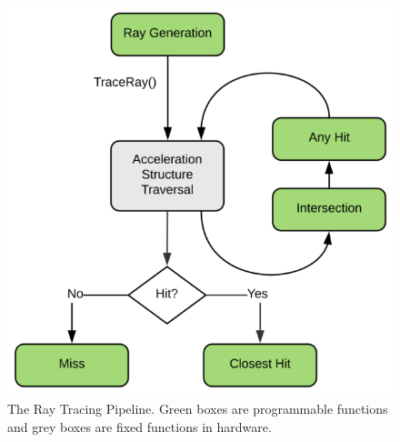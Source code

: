 \documentclass[12pt]{article}
\begin{document}
\begin{figure}[H]
    \begin{center}
        \includegraphics[scale=0.25]{RayTracing-Pipeline}
    \end{center}
    \caption{
        The Ray Tracing Pipeline.
        Green boxes are programmable functions and grey boxes are fixed functions in hardware.
        \parencite{NVIDIA:DXR-Intro}
        }
    \label{fig:RayTracing-Pipeline}
\end{figure}
\end{document}
